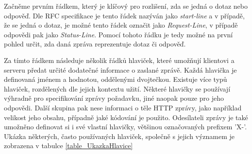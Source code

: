 
Začněme prvním řádkem, který je klíčový pro rozlišení, zda se jedná o dotaz nebo odpověď. Dle RFC specifikace je tento řádek nazýván jako \textit{start-line} a v případě, že se jedná o dotaz, je možné tento řádek označit jako \textit{Request-Line}, v případě odpovědi pak jako \textit{Status-Line}. Pomocí tohoto řádku je tedy možné na první pohled určit, zda daná zpráva reprezentuje dotaz či odpověď. 

Za tímto řádkem následuje několik řádků hlaviček, které umožňují klientovi a serveru předat určité dodatečné informace o zaslané zprávě. Každá hlavička je definovaná jménem a hodnotou, oddělenými dvojtečkou. Existuje více typů hlaviček, rozdělených dle jejich kontextu užití. Některé hlavičky se používají výhradně pro specifikování zprávy požadavku, jiné naopak pouze pro jeho odpovědi. Další skupina pak nese informaci o těle HTTP zprávy, jako například velikost jeho obsahu, případně jaké kódování je použito. Odesílateli zprávy je také umožněno definovat si i své vlastní hlavičky, většinou označovaných prefixem 'X-'. Ukázka některých, často používaných hlaviček, společně s jejich významem je zobrazena v tabulce \ref{table_UkazkaHlavice}


